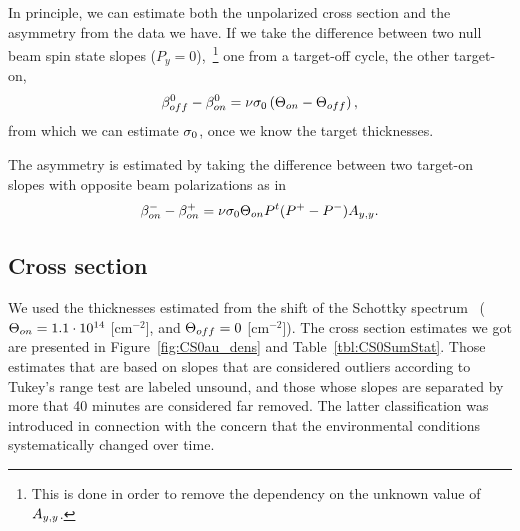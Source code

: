 \documentclass{article}
\begin{document}
In principle, we can estimate both the unpolarized cross section and the asymmetry from the data we have. If we take the difference between two null beam spin state slopes ($P_y = 0$),~\footnote{This is done in order to remove the dependency on the unknown value of $\Ayy$.} one from a target-off cycle, the other target-on, 
\[
	\slp[off]^0 - \slp[on]^0 = \nu\CS[0]\bkt{\Thick[on]-\Thick[off]},
\]
from which we can estimate $\CS[0]$, once we know the target thicknesses.

The asymmetry is estimated by taking the difference between two target-on slopes with opposite beam polarizations as in
\[
	\slp[on]^- - \slp[on]^+ = \nu\CS[0]\Thick[on] P^t\DP*\Ayy.
\]
\subsection{Cross section}
We used the thicknesses estimated from the shift of the Schottky spectrum~\cite{Stein} ($\Thick[on] = \vp{1.1}{14}$ [cm$^{-2}$], and $\Thick[off] = 0$ [cm$^{-2}$]). The cross section estimates we got are presented in Figure~\ref{fig:CS0au_dens} and Table~\ref{tbl:CS0SumStat}. Those estimates that are based on slopes that are considered outliers according to Tukey's range test are labeled unsound, and those whose slopes are separated by more that 40 minutes are considered far removed. The latter classification was introduced in connection with the concern that the environmental conditions systematically changed over time.
\end{document}
